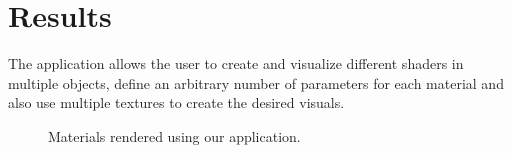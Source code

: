 \section{Results}
The application allows the user to create and visualize different shaders in multiple objects, define an arbitrary number of parameters for each material and also use multiple textures to create the desired visuals.

\begin{figure*}[!t]
\centering
{}
\hfil
{}
\hfil
{}
\caption{Materials rendered using our application.}
\end{figure*}
